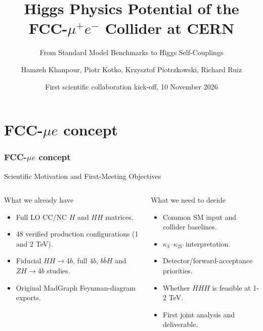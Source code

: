 \documentclass[aspectratio=1610,english]{beamer}
\title[Higgs physics at FCC-$\mu e$]{Higgs Physics Potential of the FCC-$\mu^+e^-$ Collider at CERN}
\subtitle{From Standard Model Benchmarks to Higgs Self-Couplings}
\author[Hamzeh Khanpour]{Hamzeh Khanpour, Piotr Kotko, Krzysztof Piotrzkowski, Richard Ruiz}
\institute[AGH]{AGH University of Krakow}
\date{First scientific collaboration kick-off, 10 November 2026}
\newcommand{\src}[1]{\vfill{\par\color{black!65}\fontsize{6.4}{7.4}\selectfont\emph{Source:} #1\par}}
\newcommand{\key}[1]{\begin{alertblock}{Physics takeaway}\small  #1\end{alertblock}}
\begin{document}
\part{FCC-$\mu e$ concept}
\section{FCC-$\mu e$ concept}




\begin{frame}
\titlepage
\end{frame}



\begin{frame}[t]{Scientific Motivation and First-Meeting Objectives}
\small

\begin{columns}%
\begin{block}{What we already have}
\begin{itemize}
\justifying
\item Full LO CC/NC $H$ and $HH$ matrices.
\item 48 verified production configurations (1 and 2 TeV).
\item Fiducial $HH\to4b$, full $4b$, $b\bar bH$ and $ZH\to4b$ studies.
\item Original MadGraph Feynman-diagram exports.
\end{itemize}\end{block}
\begin{exampleblock}{What we need to decide}
\begin{itemize}
\justifying 
\item Common SM input and collider baselines.
\item $\kappa_3$--$\kappa_{2V}$ interpretation.
\item Detector/forward-acceptance priorities.
\item Whether $HHH$ is feasible at 1-2 TeV.
\item First joint analysis and deliverable.
\end{itemize}\end{exampleblock}
\end{columns}


\end{frame}
\end{document}
